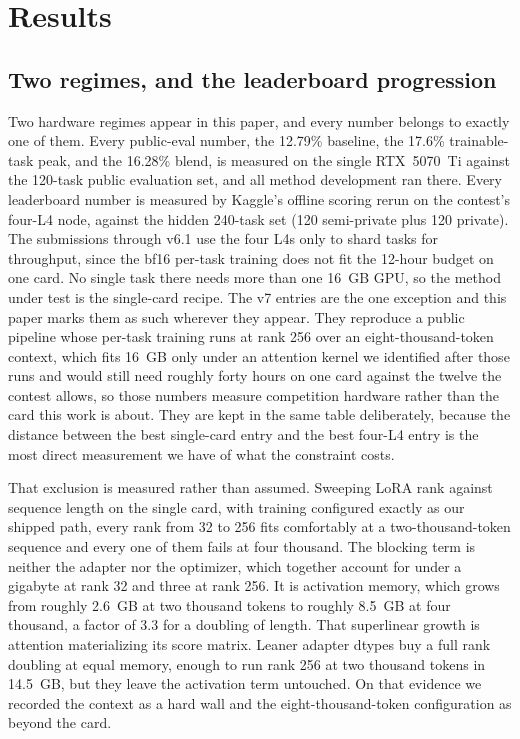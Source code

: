 \documentclass[11pt]{article}
\begin{document}
\section{Results}
\label{sec:results}

\subsection{Two regimes, and the leaderboard progression}
Two hardware regimes appear in this paper, and every number belongs to exactly one of them. Every
public-eval number, the 12.79\% baseline, the 17.6\% trainable-task peak, and the 16.28\% blend, is
measured on the single RTX~5070~Ti against the 120-task public evaluation set, and all method
development ran there. Every leaderboard number is measured by Kaggle's offline scoring rerun on the
contest's four-L4 node, against the hidden 240-task set (120 semi-private plus 120 private). The
submissions through v6.1 use the four L4s only to shard tasks for throughput, since the bf16 per-task
training does not fit the 12-hour budget on one card. No single task there needs more than one 16~GB
GPU, so the method under test is the single-card recipe. The v7 entries are the one exception and this
paper marks them as such wherever they appear. They reproduce a public pipeline whose per-task training
runs at rank 256 over an eight-thousand-token context, which fits 16~GB only under an attention kernel we
identified after those runs and would still need roughly forty hours on one card against the twelve the
contest allows, so those numbers measure competition hardware rather than the card this work is about. They are kept in the same table
deliberately, because the distance between the best single-card entry and the best four-L4 entry is the
most direct measurement we have of what the constraint costs.

That exclusion is measured rather than assumed. Sweeping LoRA rank against sequence length on the single
card, with training configured exactly as our shipped path, every rank from 32 to 256 fits comfortably at a
two-thousand-token sequence and every one of them fails at four thousand. The blocking term is neither the
adapter nor the optimizer, which together account for under a gigabyte at rank 32 and three at rank 256. It
is activation memory, which grows from roughly 2.6~GB at two thousand tokens to roughly 8.5~GB at four
thousand, a factor of 3.3 for a doubling of length. That superlinear growth is attention materializing its
score matrix. Leaner adapter dtypes buy a full rank doubling at equal memory, enough to run rank 256 at two
thousand tokens in 14.5~GB, but they leave the activation term untouched. On that evidence we recorded the
context as a hard wall and the eight-thousand-token configuration as beyond the card.
\end{document}
